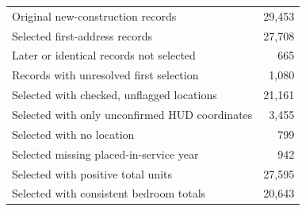 \begin{tabular}{lr}
\hline
Original new-construction records & 29,453 \\
Selected first-address records & 27,708 \\
Later or identical records not selected & 665 \\
Records with unresolved first selection & 1,080 \\
Selected with checked, unflagged locations & 21,161 \\
Selected with only unconfirmed HUD coordinates & 3,455 \\
Selected with no location & 799 \\
Selected missing placed-in-service year & 942 \\
Selected with positive total units & 27,595 \\
Selected with consistent bedroom totals & 20,643 \\
\hline
\end{tabular}
